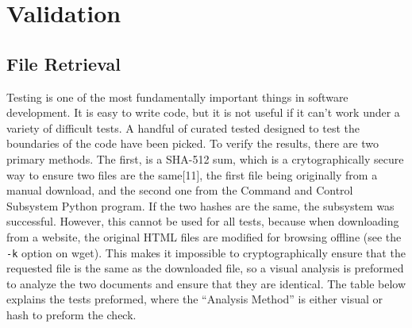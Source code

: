 \documentclass{article}
\begin{document}
\section{Validation}

\subsection{File Retrieval}
Testing is one of the most fundamentally important things in software
development. It is easy to write code, but it is not useful if it
can't work under a variety of difficult tests. A handful of curated
tested designed to test the boundaries of the code have been
picked. To verify the results, there are two primary methods. The
first, is a SHA-512 sum, which is a crytographically secure way to
ensure two files are the same[11], the first file being originally from a
manual download, and the second one from the Command and Control
Subsystem Python program. If the two hashes are the same, the subsystem was
successful. However, this cannot be used for all
tests, because when downloading from a website, the original HTML files
are modified for browsing offline (see the \texttt{-k} option on
wget). This makes it impossible to cryptographically ensure that the
requested file is the same as the downloaded file, so a visual
analysis is preformed to analyze the two documents and ensure that
they are identical. The table below explains the tests preformed,
where the ``Analysis Method'' is either visual or hash to preform the
check. 
\end{document}
